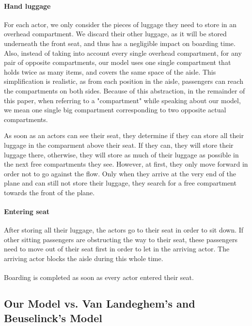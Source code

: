 \documentclass[11pt]{article}
\begin{document}
\paragraph{Hand luggage}
For each actor, we only consider the pieces of luggage they need to store in an overhead compartment. We discard their other luggage, as it will be stored underneath the front seat, and thus has a negligible impact on boarding time. Also, instead of taking into account every single overhead compartment, for any pair of opposite compartments, our model uses one single compartment that holds twice as many items, and covers the same space of the aisle. This simplification is realistic, as from each position in the aisle, passengers can reach the compartments on both sides. Because of this abstraction, in the remainder of this paper, when referring to a "compartment" while speaking about our model, we mean one single big compartment corresponding to two opposite actual compartments.

	As soon as an actors can see their seat, they determine if they can store all their luggage in the comparment above their seat. If they can, they will store their luggage there, otherwise, they will store as much of their luggage as possible in the next free compartments they see. However, at first, they only move forward in order not to go against the flow. Only when they arrive at the very end of the plane and can still not store their luggage, they search for a free compartment towards the front of the plane.


\paragraph{Entering seat}
After storing all their luggage, the actors go to their seat in order to sit down. If other sitting passengers are obstructing the way to their seat, these passengers need to move out of their seat first in order to let in the arriving actor. The arriving actor blocks the aisle during this whole time.
\\\\
Boarding is completed as soon as every actor entered their seat.






\subsection{Our Model vs. Van Landeghem's and Beuselinck's Model} 
\end{document}
